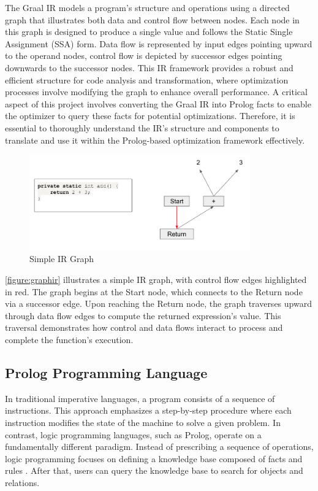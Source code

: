 The Graal IR \cite{Duboscq2013} models a program's structure and operations using a directed graph that illustrates both data and control flow between nodes. Each node in this graph is designed to produce a single value and follows the Static Single Assignment (SSA) \cite{Ron1991} form. Data flow is represented by input edges pointing upward to the operand nodes, control flow is depicted by successor edges pointing downwards to the successor nodes. This IR framework provides a robust and efficient structure for code analysis and transformation, where optimization processes involve modifying the graph to enhance overall performance. A critical aspect of this project involves converting the Graal IR into Prolog facts to enable the optimizer to query these facts for potential optimizations. Therefore, it is essential to thoroughly understand the IR's structure and components to translate and use it within the Prolog-based optimization framework effectively.

\begin{figure}[h]
    \centering
    \includegraphics[width=0.85\textwidth]{Packages/graphir.png}
    \caption{Simple IR Graph}
    \label{figure:graphir}
\end{figure}

\autoref{figure:graphir} illustrates a simple IR graph, with control flow edges highlighted in red. The graph begins at the Start node, which connects to the Return node via a successor edge. Upon reaching the Return node, the graph traverses upward through data flow edges to compute the returned expression’s value. This traversal demonstrates how control and data flows interact to process and complete the function's execution.

\subsection{Prolog Programming Language}

In traditional imperative languages, a program consists of a sequence of instructions. This approach emphasizes a step-by-step procedure where each instruction modifies the state of the machine to solve a given problem. In contrast, logic programming languages, such as Prolog, operate on a fundamentally different paradigm. Instead of prescribing a sequence of operations, logic programming focuses on defining a knowledge base composed of facts and rules \cite{Bramer2013}. After that, users can query the knowledge base to search for objects and relations. 

